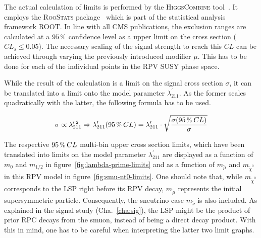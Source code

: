 The actual calculation of limits is performed by the \textsc{HiggsCombine} tool~\cite{clsmod,higgscombine}. It employs the \textsc{RooStats} package~\cite{roostats} which is part of the statistical analysis framework \textsc{ROOT}. In line with all CMS publications, the exclusion ranges are calculated at a $95\,\pct$ confidence level as a upper limit on the cross section ($CL_s \leq 0.05$). The necessary scaling of the signal strength to reach this $CL$ can be achieved through varying the previously introduced modifier $\mu$. This has to be done for each of the individual points in the RPV SUSY phase space.

While the result of the calculation is a limit on the signal cross section $\sigma$, it can be translated into a limit onto the model parameter $\lambda^\prime_{211}$. As the former scales quadratically with the latter, the following formula has to be used.

\begin{equation}
  \label{eq:xs-lambda-scale}
  \sigma \propto \lambda^{\prime\:2}_{211} \Rightarrow \lambda^\prime_{211} (95\,\pct\: CL) = \lambda^\prime_{211} \cdot \sqrt{ \frac{\sigma (95\,\pct\: CL)}{\sigma} } 
\end{equation}

The respective $95\,\pct\: CL$ multi-bin upper cross section limits, which have been translated into limits on the model parameter $\lambda^{\prime}_{211}$ are displayed as a function of $m_0$ and $m_{1/2}$ in figure~\ref{fig:lambda-prime-limits} and as a function of $m_{\tilde{\mu}}$ and $m_{\tilde{\chi}^0}$ in this RPV model in figure~\ref{fig:smu-nt0-limits}. One should note that, while $m_{\tilde{\chi}^0}$ corresponds to the LSP right before its RPV decay, $m_{\tilde{\mu}}$ represents the initial supersymmetric particle. Consequently, the sneutrino case $m_{\tilde{\nu}}$ is also included. As explained in the signal study (Cha.~\ref{cha:sig}), the LSP might be the product of prior RPC decays from the smuon, instead of being a direct decay product. With this in mind, one has to be careful when interpreting the latter two limit graphs.

